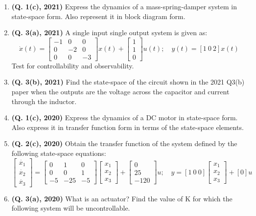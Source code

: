 \documentclass[12pt, a4paper]{article}
\begin{document}
\begin{enumerate}
		\item \textbf{(Q. 1(c), 2021)} Express the dynamics of a mass-spring-damper system in state-space form. Also represent it in block diagram form.
		\item \textbf{(Q. 3(a), 2021)} A single input single output system is given as:
		\[ \dot{x}(t) = \begin{bmatrix} -1 & 0 & 0 \\ 0 & -2 & 0 \\ 0 & 0 & -3 \end{bmatrix} x(t) + \begin{bmatrix} 1 \\ 1 \\ 0 \end{bmatrix} u(t); \quad y(t) = [1 \ 0 \ 2]x(t) \]
		Test for controllability and observability.
		\item \textbf{(Q. 3(b), 2021)} Find the state-space of the circuit shown in the 2021 Q3(b) paper when the outputs are the voltage across the capacitor and current through the inductor.
		\item \textbf{(Q. 1(c), 2020)} Express the dynamics of a DC motor in state-space form. Also express it in transfer function form in terms of the state-space elements.
		\item \textbf{(Q. 2(c), 2020)} Obtain the transfer function of the system defined by the following state-space equations:
		\[ \begin{bmatrix} \dot{x_1} \\ \dot{x_2} \\ \dot{x_3} \end{bmatrix} = \begin{bmatrix} 0 & 1 & 0 \\ 0 & 0 & 1 \\ -5 & -25 & -5 \end{bmatrix} \begin{bmatrix} x_1 \\ x_2 \\ x_3 \end{bmatrix} + \begin{bmatrix} 0 \\ 25 \\ -120 \end{bmatrix} u; \quad y = [1 \ 0 \ 0] \begin{bmatrix} x_1 \\ x_2 \\ x_3 \end{bmatrix} + [0]u \]
		\item \textbf{(Q. 3(a), 2020)} What is an actuator? Find the value of K for which the following system will be uncontrollable.

\end{enumerate}
\end{document}

